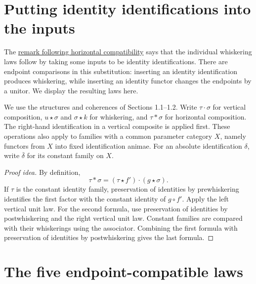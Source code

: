 \documentclass[11pt]{article}
\begin{document}
\section*{Putting identity identifications into the inputs}

The \href{coherences.html\#rmk:Isomorphisms_Of_Natural_Isomorphisms}{remark
following horizontal compatibility} says that the individual whiskering
laws follow by taking some inputs to be identity identifications.
There are endpoint comparisons in this substitution: inserting an identity
identification produces whiskering, while inserting an identity functor
changes the endpoints by a unitor. We display the resulting laws here.

We use the structures and coherences of Sections 1.1--1.2.
Write $\tau\cdot\sigma$ for vertical composition, $u\star\sigma$ and
$\sigma\star k$ for whiskering, and $\tau\ast\sigma$ for horizontal
composition. The right-hand identification in a vertical composite is applied
first. These operations also apply to families with a common parameter category
$X$, namely functors from $X$ into fixed identification animae.
For an absolute identification $\delta$, write $\overline\delta$ for its
constant family on $X$.

\begin{proof}[Proof idea]
By definition,
\[
 \tau\ast\sigma=(\tau\star f')\cdot(g\star\sigma).
\]
If $\tau$ is the constant identity family, preservation of identities by
prewhiskering identifies the first factor with the constant identity of
$g\circ f'$. Apply the left vertical unit law. For the second formula,
use preservation of identities by postwhiskering and the right vertical unit
law. Constant families are compared with their whiskerings using the
associator. Combining the first formula with preservation of identities by
postwhiskering gives the last formula.
\end{proof}

\section*{The five endpoint-compatible laws}
\end{document}
